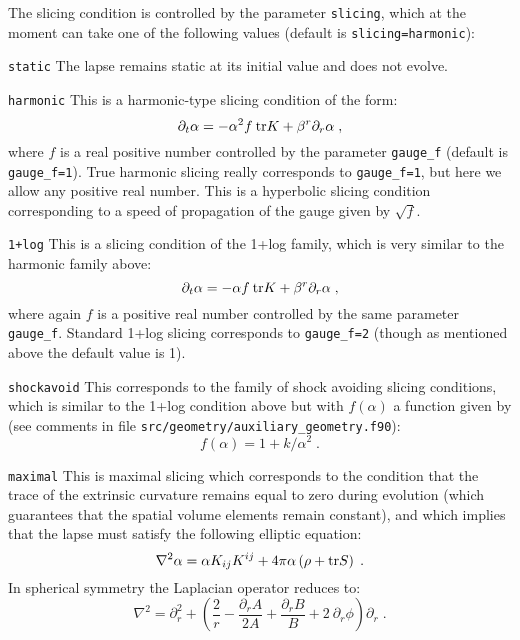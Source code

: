 \documentclass[12pt]{article}
\begin{document}
The slicing condition is controlled by the parameter \texttt{slicing}, which at the
moment can take one of the following values (default is \texttt{slicing=harmonic}):

\begin{list}{}{
\setlength{\leftmargin}{35mm}
\setlength{\labelsep}{10mm}
\setlength{\labelwidth}{20mm}}

\item[\texttt{static}] The lapse remains static at its initial value and does not evolve.

\item[\texttt{harmonic}] This is a harmonic-type slicing condition of the form:
\begin{equation}
\partial_t \alpha = - \alpha^2 f \: {\rm tr} K + \beta^r \partial_r \alpha \; ,
\end{equation}
where $f$ is a real positive number controlled by the parameter
\texttt{gauge\_f} (default is \texttt{gauge\_f=1}). True harmonic
slicing really corresponds to \texttt{gauge\_f=1}, but here we allow
any positive real number.  This is a hyperbolic slicing condition
corresponding to a speed of propagation of the gauge given by
$\sqrt{f}$.

\item[\texttt{1+log}] This is a slicing condition of the 1+log family,
  which is very similar to the harmonic family above:
\begin{equation}
\partial_t \alpha = - \alpha f \: {\rm tr} K + \beta^r \partial_r \alpha \; ,
\end{equation}
where again $f$ is a positive real number controlled by the same
parameter \texttt{gauge\_f}.  Standard 1+log slicing corresponds to 
\texttt{gauge\_f=2} (though as mentioned above the default value is 1).


\item[\texttt{shockavoid}] This corresponds to the family of shock
  avoiding slicing conditions, which is similar to the 1+log
  condition above but with $f(\alpha)$ a function given by (see
    comments in file \texttt{src/geometry/auxiliary\_geometry.f90}):
\begin{equation}
f(\alpha) = 1 + k/\alpha^2 \; .
\end{equation}

\item[\texttt{maximal}] This is maximal slicing which corresponds to
  the condition that the trace of the extrinsic curvature remains
  equal to zero during evolution (which guarantees that the spatial
  volume elements remain constant), and which implies that the lapse
  must satisfy the following elliptic equation:
\begin{equation}
\nabla^2 \alpha = \alpha K_{ij} K^{ij} + 4 \pi \alpha  \left( \rho + {\rm tr} S \right) \; .
\end{equation}
In spherical symmetry the Laplacian operator reduces to:
\begin{equation}
\nabla^2 = \partial_r^2 + \left( \frac{2}{r} - \frac{\partial_r A}{2A} 
+ \frac{\partial_r B}{B} + 2 \: \partial_r \phi \right) \partial_r \; .
\end{equation}


\end{list}
\end{document}
